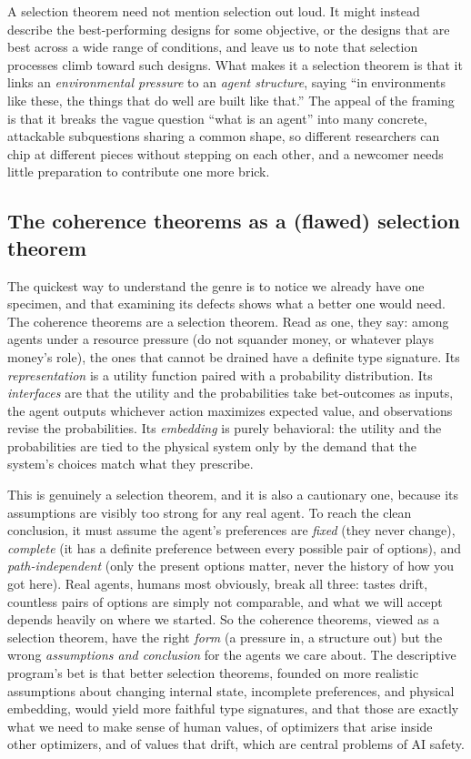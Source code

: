 \documentclass[10pt]{article}
\theoremstyle{definition}
\theoremstyle{remark}
\begin{document}
A selection theorem need not mention selection out loud. It might instead describe the best-performing designs for some objective, or the designs that are best across a wide range of conditions, and leave us to note that selection processes climb toward such designs. What makes it a selection theorem is that it links an \emph{environmental pressure} to an \emph{agent structure}, saying ``in environments like these, the things that do well are built like that.'' The appeal of the framing is that it breaks the vague question ``what is an agent'' into many concrete, attackable subquestions sharing a common shape, so different researchers can chip at different pieces without stepping on each other, and a newcomer needs little preparation to contribute one more brick.

\subsection{The coherence theorems as a (flawed) selection theorem}

The quickest way to understand the genre is to notice we already have one specimen, and that examining its defects shows what a better one would need. The coherence theorems are a selection theorem. Read as one, they say: among agents under a resource pressure (do not squander money, or whatever plays money's role), the ones that cannot be drained have a definite type signature. Its \emph{representation} is a utility function paired with a probability distribution. Its \emph{interfaces} are that the utility and the probabilities take bet-outcomes as inputs, the agent outputs whichever action maximizes expected value, and observations revise the probabilities. Its \emph{embedding} is purely behavioral: the utility and the probabilities are tied to the physical system only by the demand that the system's choices match what they prescribe.

This is genuinely a selection theorem, and it is also a cautionary one, because its assumptions are visibly too strong for any real agent. To reach the clean conclusion, it must assume the agent's preferences are \emph{fixed} (they never change), \emph{complete} (it has a definite preference between every possible pair of options), and \emph{path-independent} (only the present options matter, never the history of how you got here). Real agents, humans most obviously, break all three: tastes drift, countless pairs of options are simply not comparable, and what we will accept depends heavily on where we started. So the coherence theorems, viewed as a selection theorem, have the right \emph{form} (a pressure in, a structure out) but the wrong \emph{assumptions and conclusion} for the agents we care about. The descriptive program's bet is that better selection theorems, founded on more realistic assumptions about changing internal state, incomplete preferences, and physical embedding, would yield more faithful type signatures, and that those are exactly what we need to make sense of human values, of optimizers that arise inside other optimizers, and of values that drift, which are central problems of AI safety.
\end{document}
